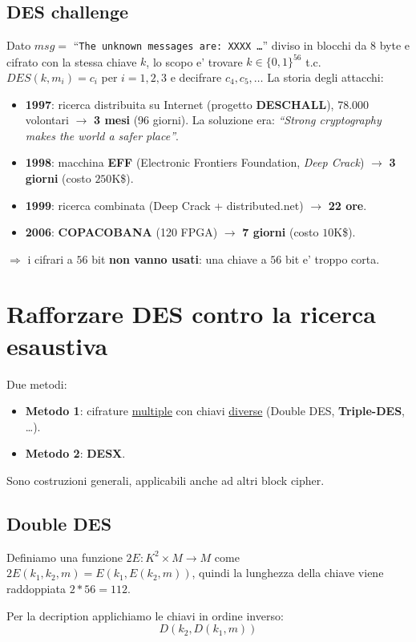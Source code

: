 \subsection{DES challenge}
Dato $ msg = $ ``\texttt{The unknown messages are: XXXX \dots}'' diviso in blocchi da $ 8 $ byte e cifrato con la stessa chiave $ k $, lo scopo e' trovare $ k \in \{0,1\}^{56} $ t.c. $ DES(k, m_i) = c_i $ per $ i = 1, 2, 3 $ e decifrare $ c_4, c_5, \dots $ La storia degli attacchi:
\begin{itemize}
  \item \textbf{1997}: ricerca distribuita su Internet (progetto \textbf{DESCHALL}), 78.000 volontari $ \to $ \textbf{3 mesi} (96 giorni). La soluzione era: \textit{``Strong cryptography makes the world a safer place''}.
  \item \textbf{1998}: macchina \textbf{EFF} (Electronic Frontiers Foundation, \textit{Deep Crack}) $ \to $ \textbf{3 giorni} (costo $ 250 $K\$).
  \item \textbf{1999}: ricerca combinata (Deep Crack + distributed.net) $ \to $ \textbf{22 ore}.
  \item \textbf{2006}: \textbf{COPACOBANA} (120 FPGA) $ \to $ \textbf{7 giorni} (costo $ 10 $K\$).
\end{itemize}
$ \Rightarrow $ i cifrari a $ 56 $ bit \textbf{non vanno usati}: una chiave a $ 56 $ bit e' troppo corta.

\section{Rafforzare DES contro la ricerca esaustiva}
Due metodi:
\begin{itemize}
  \item \textbf{Metodo 1}: cifrature \underline{multiple} con chiavi \underline{diverse} (Double DES, \textbf{Triple-DES}, \dots).
  \item \textbf{Metodo 2}: \textbf{DESX}.
\end{itemize}
Sono costruzioni generali, applicabili anche ad altri block cipher.

\subsection{Double DES}
Definiamo una funzione $ 2E: K^2 \times M \to M $ come $ 2E(k_1,k_2,m) = E(k_1, E(k_2, m)) $, quindi la lunghezza della chiave viene raddoppiata $ 2*56 = 112 $.

Per la decription applichiamo le chiavi in ordine inverso:
\[
  D(k_2, D(k_1, m))
\]


